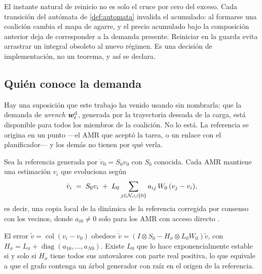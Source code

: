 \begin{observacion}
\label{obs:reset-donde}
El instante natural de reinicio no es solo el cruce por cero del exceso. Cada
transición del autómata de \cref{def:automata} invalida el acumulado: al formarse
una coalición cambia el mapa de agarre, y el precio acumulado bajo la
composición anterior deja de corresponder a la demanda presente. Reiniciar en la
guarda evita arrastrar un integral obsoleto al nuevo régimen. Es una decisión de
implementación, no un teorema, y así se declara.
\end{observacion}

\subsection{Quién conoce la demanda}

Hay una suposición que este trabajo ha venido usando sin nombrarla: que la
demanda de \emph{wrench} $\bm{w}^{\mathrm{d}}_\ell$, generada por la trayectoria deseada de la
carga, está disponible para todos los miembros de la coalición. No lo está. La
referencia se origina en un punto —el AMR que aceptó la tarea, o un enlace con
el planificador— y los demás no tienen por qué verla.

\begin{definicion}
\label{def:observador-dist}
Sea la referencia generada por $\dot v_0=S_0v_0$ con $S_0$ conocida. Cada AMR
mantiene una estimación $v_i$ que evoluciona según
\[
  \dot v_i\;=\;S_0v_i\;+\;L_0\sum_{j\in\mathcal{N}_i\cup\{0\}}a_{ij}\,W_0\,(v_j-v_i),
\]
es decir, una copia local de la dinámica de la referencia corregida por consenso
con los vecinos, donde $a_{i0}\neq0$ solo para los AMR con acceso directo
\cite{cai2022cooperative}.
\end{definicion}

\begin{proposicion}
\label{pr:observador-dist}
El error $\tilde v=\operatorname{col}(v_i-v_0)$ obedece
$\dot{\tilde v}=(I\otimes S_0-H_\sigma\otimes L_0W_0)\tilde v$, con
$H_\sigma=L_\sigma+\operatorname{diag}(a_{10},\dots,a_{N0})$. Existe $L_0$ que lo
hace exponencialmente estable si y solo si $H_\sigma$ tiene todos sus autovalores
con parte real positiva, lo que equivale a que el grafo contenga un árbol
generador con raíz en el origen de la referencia.
\end{proposicion}

